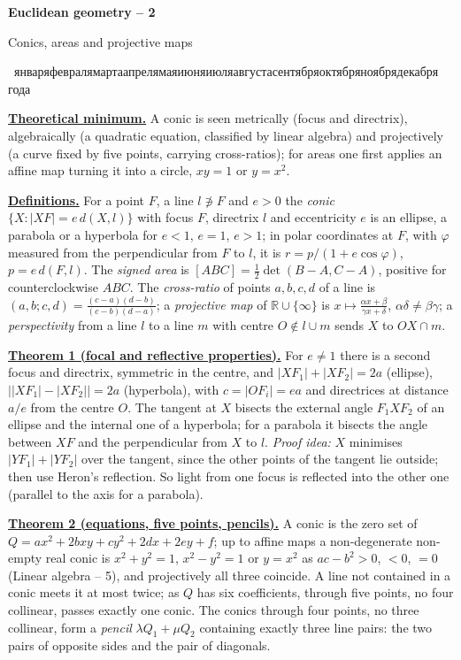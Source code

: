 \documentclass[11pt,a4paper]{article}
\newcommand{\head}[1]{\par\medskip\noindent\textbf{\underline{#1}}\quad}
\newcommand{\sheettitle}[3]{%
  \begin{center}
  {\huge\bfseries #1\par}\vspace{1.2em}
  {\Large #2\par}\vspace{0.8em}
  \if\relax\detokenize{#3}\relax\else{\Large #3\par}\vspace{0.8em}\fi
  {\begin{otherlanguage}{russian}\number\day~\ifcase\month\or января\or февраля\or марта\or апреля\or мая\or июня\or июля\or августа\or сентября\or октября\or ноября\or декабря\fi~\number\year~года\end{otherlanguage}\par}
  \end{center}\vspace{0.5em}}
\begin{document}
\sheettitle{Euclidean geometry -- 2}{Conics, areas and projective maps}{}

\head{Theoretical minimum.} A conic is seen metrically (focus and directrix),
algebraically (a quadratic equation, classified by linear algebra) and
projectively (a curve fixed by five points, carrying cross-ratios); for areas
one first applies an affine map turning it into a circle, $xy=1$ or $y=x^2$.

\head{Definitions.} For a point $F$, a line $l\not\ni F$ and $e>0$ the
\emph{conic} $\{X: |XF|=e\,d(X,l)\}$ with focus $F$, directrix $l$ and
eccentricity $e$ is an ellipse, a parabola or a hyperbola for $e<1$, $e=1$,
$e>1$; in polar coordinates at $F$, with $\varphi$ measured from the
perpendicular from $F$ to $l$, it is $r=p/(1+e\cos\varphi)$, $p=e\,d(F,l)$.
The \emph{signed area} is $[ABC]=\frac12\det(B-A,C-A)$, positive for
counterclockwise $ABC$. The \emph{cross-ratio} of points $a,b,c,d$ of a line
is $(a,b;c,d)=\frac{(c-a)(d-b)}{(c-b)(d-a)}$; a \emph{projective map} of
$\mathbb R\cup\{\infty\}$ is $x\mapsto\frac{\alpha x+\beta}{\gamma x+\delta}$,
$\alpha\delta\ne\beta\gamma$; a \emph{perspectivity} from a line $l$ to a line
$m$ with centre $O\notin l\cup m$ sends $X$ to $OX\cap m$.

\head{Theorem 1 (focal and reflective properties).} For $e\ne1$ there is a
second focus and directrix, symmetric in the centre, and
$|XF_1|+|XF_2|=2a$ (ellipse), $\bigl||XF_1|-|XF_2|\bigr|=2a$ (hyperbola), with
$c=|OF_i|=ea$ and directrices at distance $a/e$ from the centre $O$. The
tangent at $X$ bisects the external angle $F_1XF_2$ of an ellipse and the
internal one of a hyperbola; for a parabola it bisects the angle between $XF$
and the perpendicular from $X$ to $l$. \emph{Proof idea:} $X$ minimises
$|YF_1|+|YF_2|$ over the tangent, since the other points of the tangent lie
outside; then use Heron's reflection. So light from one focus is reflected
into the other one (parallel to the axis for a parabola).

\head{Theorem 2 (equations, five points, pencils).} A conic is the zero set
of $Q=ax^2+2bxy+cy^2+2dx+2ey+f$; up to affine maps a non-degenerate non-empty
real conic is $x^2+y^2=1$, $x^2-y^2=1$ or $y=x^2$ as $ac-b^2>0$, $<0$, $=0$
(Linear algebra -- 5), and projectively all three coincide. A line not
contained in a conic meets it at most twice; as $Q$ has six coefficients,
through five points, no four collinear, passes exactly one conic. The conics
through four points, no three collinear, form a \emph{pencil}
$\lambda Q_1+\mu Q_2$ containing exactly three line pairs: the two pairs of
opposite sides and the pair of diagonals.
\end{document}
